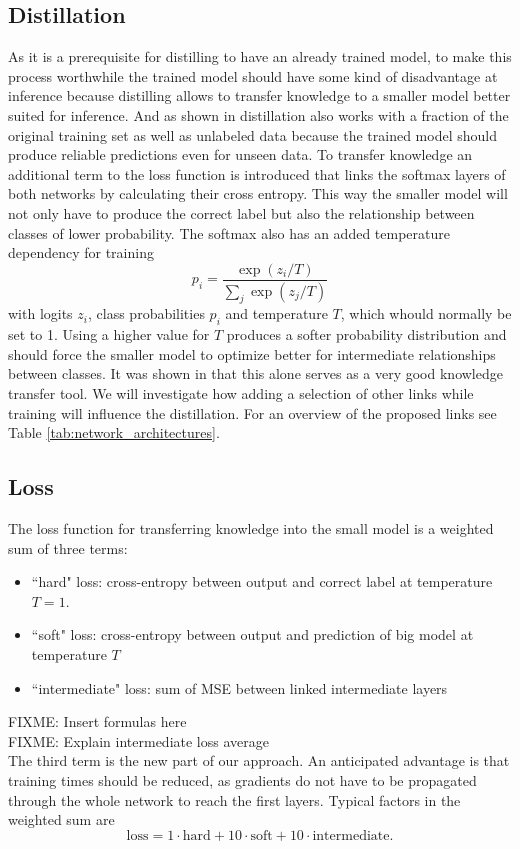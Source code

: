 \documentclass[10pt,twocolumn,letterpaper]{article}
\begin{document}
\subsection{Distillation}
As it is a prerequisite for distilling to have an already trained model, to make this process worthwhile the trained model should have some kind of disadvantage at inference because distilling allows to transfer knowledge to a smaller model better suited for inference. And as shown in \cite{hinton2015distilling} distillation also works with a fraction of the original training set as well as unlabeled data because the trained model should produce reliable predictions even for unseen data.
To transfer knowledge an additional term to the loss function is introduced that links the softmax layers of both networks by calculating their cross entropy. This way the smaller model will not only have to produce the correct label but also the relationship between classes of lower probability. The softmax also has an added temperature dependency for training
\begin{equation}
	p_i = \frac{\exp(z_i / T)}{\sum_j \exp(z_j/T)}
	\label{eq:softmaxtemperature}
\end{equation}
with logits $z_i$, class probabilities $p_i$ and temperature $T$, which whould normally be set to 1. Using a higher value for $T$ produces a softer probability distribution and should force the smaller model to optimize better for intermediate relationships between classes. It was shown in \cite{hinton2015distilling} that this alone serves as a very good knowledge transfer tool. We will investigate how adding a selection of other links while training will influence the distillation. For an overview of the proposed links see Table \ref{tab:network_architectures}.

\subsection{Loss}
The loss function for transferring knowledge into the small model is a weighted sum of three terms:
\begin{itemize}
	\item ``hard" loss: cross-entropy between output and correct label at temperature $T=1$.
	\item ``soft" loss: cross-entropy between output and prediction of big model at temperature $T$
	\item ``intermediate" loss: sum of MSE between linked intermediate layers
\end{itemize}
FIXME: Insert formulas here \\
FIXME: Explain intermediate loss average \\
The third term is the new part of our approach. An anticipated advantage is that training times should be reduced, as gradients do not have to be propagated through the whole network to reach the first layers. Typical factors in the weighted sum are
\begin{equation}
	\text{loss} = 1 \cdot \text{hard} + 10 \cdot \text{soft} + 10 \cdot \text{intermediate}.
	\label{eq:lossfactors}
\end{equation}
\end{document}
